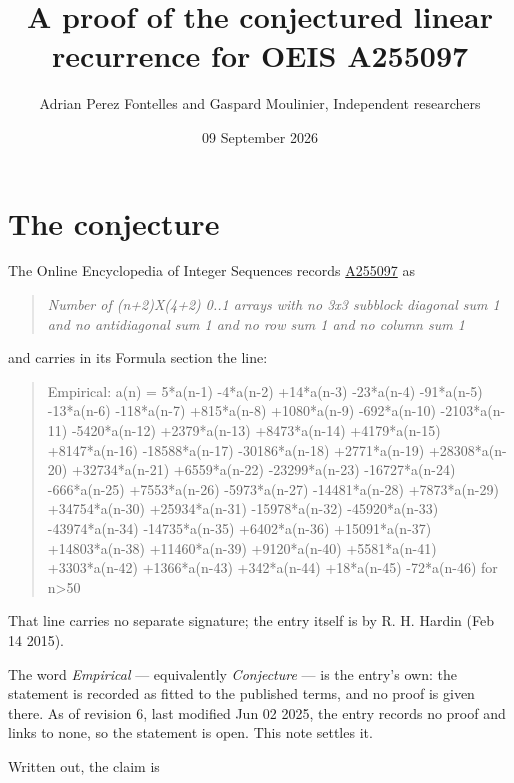 \documentclass[11pt]{article}
\title{A proof of the conjectured linear recurrence for OEIS A255097}
\author{Adrian Perez Fontelles and Gaspard Moulinier, Independent researchers}
\date{09 September 2026}
\theoremstyle{definition}
\begin{document}
\maketitle
\section{The conjecture}

The Online Encyclopedia of Integer Sequences records \href{https://oeis.org/A255097}{A255097} as

\begin{quote}\itshape Number of (n+2)X(4+2) 0..1 arrays with no 3x3 subblock diagonal sum 1 and no antidiagonal sum 1 and no row sum 1 and no column sum 1\end{quote}

and carries in its Formula section the line:

\begin{quote}\ttfamily Empirical: a(n) = 5*a(n-1) -4*a(n-2) +14*a(n-3) -23*a(n-4) -91*a(n-5) -13*a(n-6) -118*a(n-7) +815*a(n-8) +1080*a(n-9) -692*a(n-10) -2103*a(n-11) -5420*a(n-12) +2379*a(n-13) +8473*a(n-14) +4179*a(n-15) +8147*a(n-16) -18588*a(n-17) -30186*a(n-18) +2771*a(n-19) +28308*a(n-20) +32734*a(n-21) +6559*a(n-22) -23299*a(n-23) -16727*a(n-24) -666*a(n-25) +7553*a(n-26) -5973*a(n-27) -14481*a(n-28) +7873*a(n-29) +34754*a(n-30) +25934*a(n-31) -15978*a(n-32) -45920*a(n-33) -43974*a(n-34) -14735*a(n-35) +6402*a(n-36) +15091*a(n-37) +14803*a(n-38) +11460*a(n-39) +9120*a(n-40) +5581*a(n-41) +3303*a(n-42) +1366*a(n-43) +342*a(n-44) +18*a(n-45) -72*a(n-46) for n>50\end{quote}

That line carries no separate signature; the entry itself is by R. H. Hardin (Feb 14 2015).

The word {\itshape Empirical} --- equivalently {\itshape Conjecture} --- is the entry's own: the statement is recorded as fitted to the published terms, and no proof is given there. As of revision 6, last modified Jun 02 2025, the entry records no proof and links to none, so the statement is open. This note settles it.

Written out, the claim is
\end{document}
